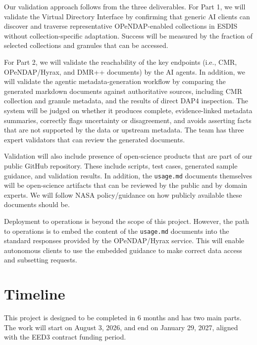 \documentclass[11pt]{article}
\begin{document}
Our validation approach follows from the three deliverables. For Part 1, we will
validate the Virtual Directory Interface by confirming that generic \ac{AI}
clients can discover and traverse representative \acs{OPeNDAP}-enabled
collections in \ac{ESDIS} without collection-specific adaptation. Success will
be measured by the fraction of selected collections and granules that can be accessed.

For Part 2, we will validate the reachability of the key endpoints (i.e.,
\ac{CMR}, \acs{OPeNDAP}/Hyrax, and \ac{DMR++} documents) by the \ac{AI} agents.
In addition, we will validate
the agentic metadata-generation workflow by
comparing the generated markdown documents against authoritative sources,
including \ac{CMR} collection and granule metadata, and the results of direct
\ac{DAP4} inspection. The system will be judged on whether it produces complete,
evidence-linked metadata summaries, correctly flags uncertainty or disagreement,
and avoids asserting facts that are not supported by the data or upstream
metadata. The team has three expert validators that can review the generated documents.


Validation will also include presence of open-science products that are part of
our public GitHub repository. These include scripts, test cases, generated
sample guidance, and validation results. In addition, the \texttt{usage.md}
documents themselves will be open-science artifacts that can be reviewed by the
public and by domain experts. We will follow NASA policy/guidance on how
publicly available these documents should be.

Deployment to operations is beyond the scope of this project. However, the path
to operations is to embed the content of the \texttt{usage.md} 
documents into the standard responses provided by the \ac{OPeNDAP}/Hyrax service. This will enable 
autonomous clients to use the embedded guidance to make correct data access and
subsetting requests.

\section{Timeline}
This project is designed to be completed in 6 months and has two main parts.
The work will start on August 3, 2026, and end on January 29, 2027, aligned 
with the EED3 contract funding period.
\end{document}
